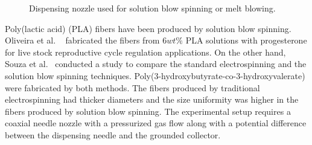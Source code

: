 \bgroup
\begin{figure}[!htbp]
\centering \makeatletter{}
\makeatother 
\caption{{Dispensing nozzle used for solution blow spinning or melt blowing. \unskip~\protect\cite{527120:13538056}}}
\label{f-92361290d8c3}
\end{figure}
\egroup
Poly(lactic acid) (PLA) fibers have been produced by solution blow spinning. Oliveira et al. \unskip~\cite{527120:13539278} fabricated the fibers from $6 wt\% $ PLA solutions with progesterone for live stock reproductive cycle regulation applications. On the other hand, Souza et al.\unskip~\cite{527120:13538056} conducted a study to compare the standard electrospinning and the solution blow spinning techniques. Poly(3-hydroxybutyrate-co-3-hydroxyvalerate) were fabricated by both methods. The fibers produced by traditional electrospinning had thicker diameters and the size uniformity was higher in the fibers produced by solution blow spinning. The experimental setup requires a coaxial needle nozzle with a pressurized gas flow along with a potential difference between the dispensing needle and the grounded collector.



